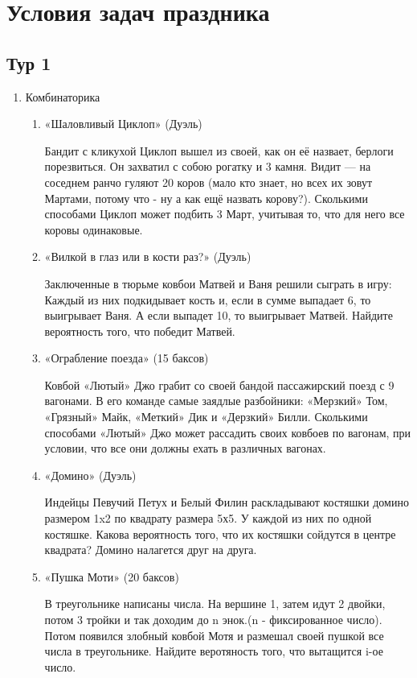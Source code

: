 \documentclass[11pt, a4paper]{article}
\theoremstyle{definition}
\begin{document}
\section*{Условия задач праздника}
\subsection*{Тур 1}
\begin{enumerate}
    \item Комбинаторика
\begin{enumerate}
    \item «Шаловливый Циклоп» (Дуэль)
    
    Бандит с кликухой Циклоп вышел из своей, как он её назвает, берлоги порезвиться. Он захватил с собою рогатку и 3 камня. Видит — на соседнем ранчо гуляют 20 коров (мало кто знает, но всех их зовут Мартами, потому что - ну а как ещё назвать корову?). Сколькими способами Циклоп может
    подбить 3 Март, учитывая то, что для него все коровы одинаковые.
    
    \item «Вилкой в глаз или в кости раз?» (Дуэль)
    
    Заключенные в тюрьме ковбои Матвей и Ваня решили сыграть в игру: Каждый из них подкидывает кость и, если в сумме выпадает 6, то выигрывает Ваня. А если выпадет 10, то выигрывает Матвей. Найдите вероятность того, что победит Матвей.
    
    \item «Ограбление поезда» (15 баксов)
    
    Ковбой «Лютый» Джо грабит со своей бандой пассажирский поезд с 9 вагонами. В его команде самые заядлые разбойники: «Мерзкий» Том, «Грязный» Майк, «Меткий» Дик и «Дерзкий» Билли.  Сколькими способами «Лютый» Джо может рассадить своих ковбоев по вагонам, при условии, что все они должны ехать в различных вагонах.
    
    \item «Домино» (Дуэль)
    
    Индейцы Певучий Петух и  Белый Филин раскладывают костяшки домино размером 1x2 по квадрату размера 5х5. У каждой из них по одной костяшке. Какова вероятность того, что их костяшки сойдутся в центре квадрата? Домино налагется друг на друга.
    
    \item «Пушка Моти» (20 баксов)
    
    В треугольнике написаны числа. На вершине 1, затем идут 2 двойки, потом 3 тройки и так доходим до n энок.(n - фиксированное число). Потом появился злобный ковбой Мотя и размешал своей пушкой все числа в треугольнике. Найдите веротяность того, что вытащится i-ое число.
    

\end{enumerate}
\end{enumerate}
\end{document}
